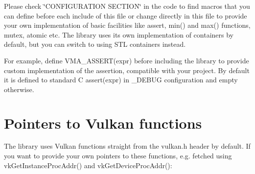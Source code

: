 Please check \char`\"{}\+C\+O\+N\+F\+I\+G\+U\+R\+A\+T\+I\+O\+N S\+E\+C\+T\+I\+O\+N\char`\"{} in the code to find macros that you can define before each include of this file or change directly in this file to provide your own implementation of basic facilities like assert, {\ttfamily min()} and {\ttfamily max()} functions, mutex, atomic etc. The library uses its own implementation of containers by default, but you can switch to using S\+TL containers instead.

For example, define {\ttfamily V\+M\+A\+\_\+\+A\+S\+S\+E\+R\+T(expr)} before including the library to provide custom implementation of the assertion, compatible with your project. By default it is defined to standard C {\ttfamily assert(expr)} in {\ttfamily \+\_\+\+D\+E\+B\+UG} configuration and empty otherwise.\hypertarget{configuration_config_Vulkan_functions}{}\section{Pointers to Vulkan functions}\label{configuration_config_Vulkan_functions}
The library uses Vulkan functions straight from the {\ttfamily vulkan.\+h} header by default. If you want to provide your own pointers to these functions, e.\+g. fetched using {\ttfamily vk\+Get\+Instance\+Proc\+Addr()} and {\ttfamily vk\+Get\+Device\+Proc\+Addr()}\+:


